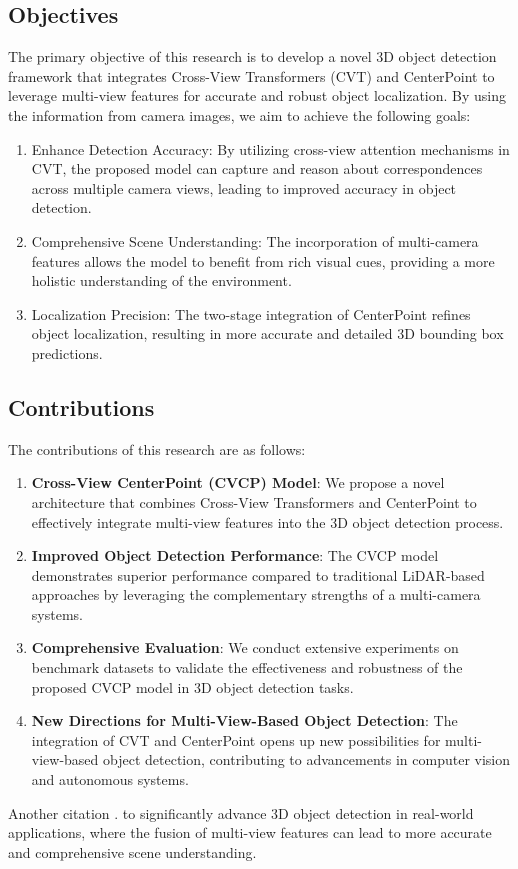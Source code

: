 \documentclass[times, report, parskip, openbib, twocolumn]{article}
\begin{document}
\subsection{Objectives}

The primary objective of this research is to develop a novel 3D object detection framework that integrates Cross-View Transformers (CVT) and CenterPoint to leverage multi-view features for accurate and robust object localization. By using the information from camera images, we aim to achieve the following goals:

\begin{enumerate}
    \item Enhance Detection Accuracy: By utilizing cross-view attention mechanisms in CVT, the proposed model can capture and reason about correspondences across multiple camera views, leading to improved accuracy in object detection.
    \item Comprehensive Scene Understanding: The incorporation of multi-camera features allows the model to benefit from rich visual cues, providing a more holistic understanding of the environment.
    \item Localization Precision: The two-stage integration of CenterPoint refines object localization, resulting in more accurate and detailed 3D bounding box predictions.
\end{enumerate}

\subsection{Contributions}

The contributions of this research are as follows:

\begin{enumerate}
    \item \textbf{Cross-View CenterPoint (CVCP) Model}: We propose a novel architecture that combines Cross-View Transformers and CenterPoint to effectively integrate multi-view features into the 3D object detection process.
    \item \textbf{Improved Object Detection Performance}: The CVCP model demonstrates superior performance compared to traditional LiDAR-based approaches by leveraging the complementary strengths of a multi-camera systems.
    \item \textbf{Comprehensive Evaluation}: We conduct extensive experiments on benchmark datasets to validate the effectiveness and robustness of the proposed CVCP model in 3D object detection tasks.
    \item \textbf{New Directions for Multi-View-Based Object Detection}: The integration of CVT and CenterPoint opens up new possibilities for multi-view-based object detection, contributing to advancements in computer vision and autonomous systems.
\end{enumerate}Another citation \cite{zhou2022cross}. to significantly advance 3D object detection in real-world applications, where the fusion of multi-view features can lead to more accurate and comprehensive scene understanding.
\end{document}
